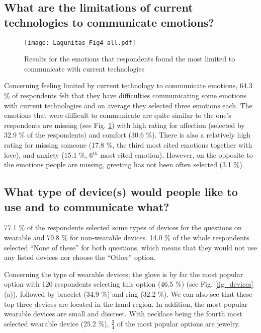 \documentclass[acmsmall]{acmart}
\begin{document}
\subsection{What are the limitations of current technologies to communicate emotions?}
\label{sec_limitation}

\begin{figure}[!t]
	\centering
	\texttt{[image: Lagunitas\_Fig4\_all.pdf]}
	\caption{Results for the emotions that respondents found the most limited to communicate with current technologies}
	\label{fig_limTech}
\end{figure}

Concerning feeling limited by current technology to communicate emotions, 64.3 \% of respondents felt that they have difficulties communicating some emotions with current technologies and on average they selected three emotions each. The emotions that were difficult to communicate are quite similar to the one's respondents are missing (see Fig. \ref{fig_limTech}) with high rating for affection (selected by 32.9 \% of the respondents) and comfort (30.6 \%). There is also a relatively high rating for missing someone (17.8 \%, the third most cited emotions together with love), and anxiety (15.1 \%, 6$^{th}$ most cited emotion). However, on the opposite to the emotions people are missing, greeting has not been often selected (3.1 \%).

\subsection{What type of device(s) would people like to use and to communicate what?}
\label{sub_devices}
77.1 \% of the respondents selected some types of devices for the questions on wearable and 79.8 \% for non-wearable devices. 14.0 \% of the whole respondents selected “None of these” for both questions, which means that they would not use any listed devices nor choose the “Other” option. 

Concerning the type of wearable devices; the glove is by far the most popular option with 120 respondents selecting this option (46.5 \%) (see Fig. \ref{fig_devices} (a)), followed by bracelet (34.9 \%) and ring (32.2 \%). We can also see that these top three devices are located in the hand region. In addition, the most popular wearable devices are small and discreet. With necklace being the fourth most selected wearable device (25.2 \%), $\frac{3}{4}$ of the most popular options are jewelry. 
\end{document}
